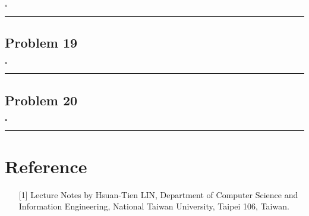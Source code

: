 \documentclass[12pt]{article}
\newcommand*{\QEDB}{\hfill\ensuremath{\square}}
\newcommand{\horrule}[1]{\rule{\linewidth}{#1}}
\begin{document}
\QEDB

\horrule{0.5pt}

\subsection*{Problem 19}

\QEDB

\horrule{0.5pt}

\subsection*{Problem 20}

\QEDB

\horrule{0.5pt}

\section*{Reference}

\begin{enumerate}

\item[{[1]}] Lecture Notes by Hsuan-Tien LIN, Department of Computer Science and Information Engineering, National Taiwan University, Taipei 106, Taiwan.


\end{enumerate}
\end{document}

